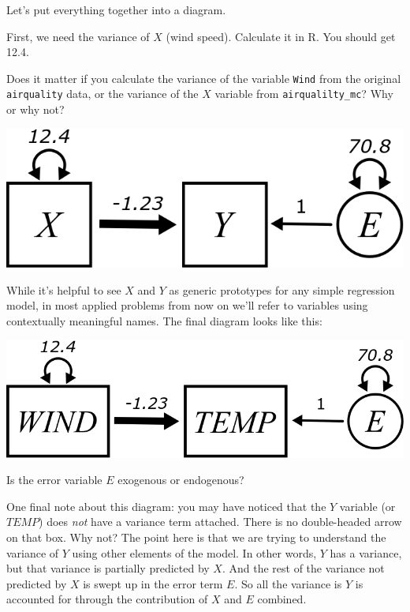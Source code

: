 \documentclass[
]{book}
\begin{document}
Let's put everything together into a diagram.

First, we need the variance of \(X\) (wind speed). Calculate it in R. You should get 12.4.

Does it matter if you calculate the variance of the variable \texttt{Wind} from the original \texttt{airquality} data, or the variance of the \(X\) variable from \texttt{airqualilty\_mc}? Why or why not?

\begin{center}\includegraphics{graphics/simple_regression_param_values} \end{center}

While it's helpful to see \(X\) and \(Y\) as generic prototypes for any simple regression model, in most applied problems from now on we'll refer to variables using contextually meaningful names. The final diagram looks like this:

\begin{center}\includegraphics{graphics/simple_regression_param_values_named_vars} \end{center}

Is the error variable \(E\) exogenous or endogenous?

One final note about this diagram: you may have noticed that the \(Y\) variable (or \(\textit{TEMP}\)) does \emph{not} have a variance term attached. There is no double-headed arrow on that box. Why not? The point here is that we are trying to understand the variance of \(Y\) using other elements of the model. In other words, \(Y\) has a variance, but that variance is partially predicted by \(X\). And the rest of the variance not predicted by \(X\) is swept up in the error term \(E\). So all the variance is \(Y\) is accounted for through the contribution of \(X\) and \(E\) combined.
\end{document}
